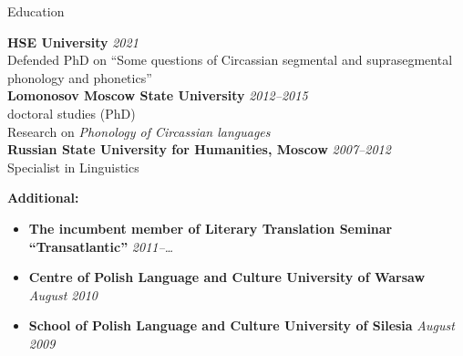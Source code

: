 \documentclass{resume} %
\begin{document}

\begin{rSection}{Education}

{\bf HSE University} \hfill {\em 2021} \\ 
Defended PhD on ``Some questions of Circassian segmental and suprasegmental phonology and phonetics''\\
{\bf Lomonosov Moscow State University} \hfill {\em 2012--2015} \\ 
doctoral studies (PhD)\\
Research on \textit{Phonology of Circassian languages}\\
{\bf Russian State University for Humanities, Moscow} \hfill {\em 2007--2012} \\ 
Specialist in Linguistics

{\bf Additional:}
\begin{itemize}
\item {\bf The incumbent member of Literary Translation Seminar ``Transatlantic''} \hfill {\em 2011--\ldots}
\item {\bf Centre of Polish Language and Culture University of Warsaw} \hfill {\em August 2010}
\item {\bf School of Polish Language and Culture University of Silesia} \hfill {\em August 2009}
\end{itemize}

\end{rSection}

\end{document}
